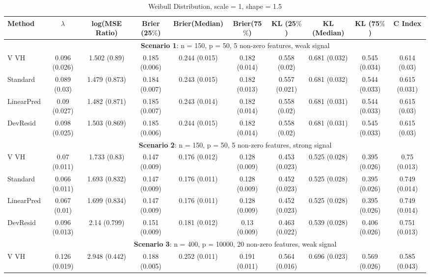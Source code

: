 \documentclass{article}
\begin{document}
\begin{landscape}
\begin{table}[ht]
\setlength{\tabcolsep}{3pt}
\caption{\label{Tab:wb2} Weibull Distribution, scale = 1, shape = 1.5}
\centering
\begin{tabular}[t]{lccccccccc}
\toprule
 Method & $\lambda$ & log(MSE Ratio) & Brier (25$\%$) & Brier(Median) & Brier(75$\%$) & KL (25$\%$)& KL (Median) & KL (75$\%$) & C Index\\
\midrule
&\multicolumn{9}{c}{\textbf{Scenario 1}: n = 150, p = 50, 5 non-zero features, weak signal}\\
\cline{2-10}
V VH  & 0.096 (0.026) & 1.502 (0.89) & 0.185 (0.006) & 0.244 (0.015) & 0.182 (0.014) & 0.558 (0.02) & 0.681 (0.032) & 0.545 (0.034) & 0.614 (0.03) \\
Standard  & 0.089 (0.03) & 1.479 (0.873) & 0.184 (0.007) & 0.243 (0.015) & 0.182 (0.013) & 0.557 (0.021) & 0.681 (0.032) & 0.544 (0.033) & 0.615 (0.031) \\
LinearPred  & 0.09 (0.027) & 1.482 (0.871) & 0.185 (0.007) & 0.243 (0.014) & 0.182 (0.014) & 0.558 (0.02) & 0.681 (0.031) & 0.544 (0.033) & 0.615 (0.03) \\
DevResid  & 0.098 (0.025) & 1.503 (0.869) & 0.185 (0.006) & 0.244 (0.015) & 0.182 (0.014) & 0.558 (0.02) & 0.681 (0.031) & 0.545 (0.033) & 0.615 (0.03) \\
\addlinespace
&\multicolumn{9}{c}{\textbf{Scenario 2}: n = 150, p = 50, 5 non-zero features, strong signal}\\
\cline{2-10}
 V VH  & 0.07 (0.011) & 1.733 (0.83) & 0.147 (0.009) & 0.176 (0.012) & 0.128 (0.009) & 0.453 (0.023) & 0.525 (0.028) & 0.395 (0.026) & 0.75 (0.013) \\ 
Standard  & 0.066 (0.011) & 1.693 (0.832) & 0.147 (0.009) & 0.176 (0.011) & 0.128 (0.009) & 0.452 (0.023) & 0.525 (0.028) & 0.395 (0.026) & 0.749 (0.014) \\
 LinearPred  & 0.067 (0.01) & 1.699 (0.834) & 0.147 (0.009) & 0.176 (0.011) & 0.128 (0.009) & 0.452 (0.023) & 0.525 (0.028) & 0.395 (0.026) & 0.749 (0.014) \\
 DevResid  & 0.096 (0.013) & 2.14 (0.799) & 0.151 (0.009) & 0.181 (0.012) & 0.13 (0.009) & 0.463 (0.022) & 0.539 (0.028) & 0.406 (0.026) & 0.751 (0.013) \\
\addlinespace
&\multicolumn{9}{c}{\textbf{Scenario 3}: n = 400, p = 10000, 20 non-zero features, weak signal}\\
\cline{2-10}
V VH  & 0.126 (0.019) & 2.948 (0.442) & 0.188 (0.005) & 0.252 (0.011) & 0.191 (0.011) & 0.564 (0.016) & 0.696 (0.023) & 0.569 (0.026) & 0.585 (0.043) \\ 

\end{tabular}
\end{table}
\end{landscape}
\end{document}
